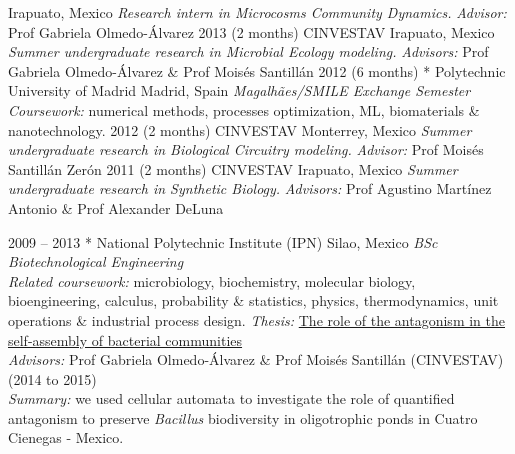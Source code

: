 \documentclass[]{friggeri-cv} %
\begin{document}
\begin{entrylist}
{Irapuato, Mexico}
{\emph{Research intern in Microcosms Community Dynamics.}}
{\emph{Advisor:} Prof Gabriela Olmedo-Álvarez }%
\entry
{2013}
{(2 months)}
{CINVESTAV}
{Irapuato, Mexico}
{\emph{Summer undergraduate research in Microbial Ecology modeling.}}
{\emph{Advisors:} Prof Gabriela Olmedo-Álvarez \& Prof Moisés Santillán }%
\entry
{2012}
{(6 months)}
{* Polytechnic University of Madrid}
{Madrid, Spain}
{\emph{Magalhães/SMILE Exchange Semester}}
{\emph{Coursework:} numerical methods, processes optimization, ML, biomaterials \& nanotechnology.}
\entry
{2012}
{(2 months)}
{CINVESTAV}
{Monterrey, Mexico}
{\emph{Summer undergraduate research in Biological Circuitry modeling.}}
{\emph{Advisor:} Prof Moisés Santillán Zerón }%
\entry
{2011}
{(2 months)}
{CINVESTAV}
{Irapuato, Mexico}
{\emph{Summer undergraduate research in Synthetic Biology.}}
{\emph{Advisors:} Prof Agustino Martínez Antonio \& Prof Alexander DeLuna}%
\end{entrylist}
\begin{entrylist}
\entry
{2009 -- 2013}
{}
{* National Polytechnic Institute (IPN)}
{Silao, Mexico}
{\emph{BSc {\normalfont Biotechnological Engineering}} \\
\emph{Related coursework:} microbiology, biochemistry, molecular biology, bioengineering, calculus, probability \& statistics, physics, thermodynamics, unit operations \& industrial process design.}
{\emph{Thesis:} \href{https://github.com/romanzapien/bsc_thesis/blob/main/BScThesis_RomanZapienCampos.pdf}{The role of the antagonism in the self-assembly of bacterial communities} \\ \emph{Advisors:} Prof Gabriela Olmedo-Álvarez \& Prof Moisés Santillán (CINVESTAV) (2014 to 2015) \\ \emph{Summary:} we used cellular automata to investigate the role of quantified antagonism to preserve \textit{Bacillus} biodiversity in oligotrophic ponds in Cuatro Cienegas - Mexico.}
\end{entrylist}
\end{document}
